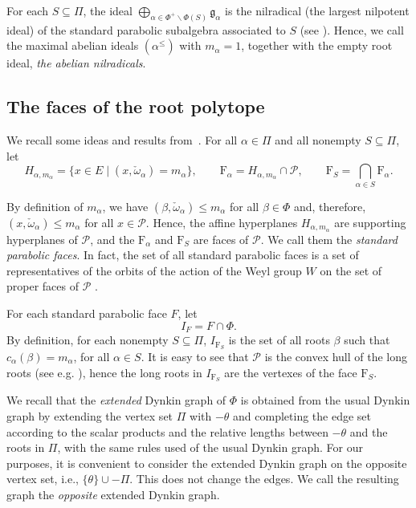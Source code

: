 \documentclass[10pt]{amsart}
\theoremstyle{definition}
\theoremstyle{remark}
\newcommand\mf{\mathfrak}
\newcommand\smeno{\smallsetminus}
\newcommand\pol{\mathcal P}
\newcommand\al{\alpha}
\newcommand\be{\beta}
\renewcommand{\leq}{\leqslant}
\begin{document}
\par
For each $S\subseteq \Pi$, the ideal $\bigoplus\limits_{\al\in \Phi^+\smeno \Phi(S)}\mf g_\al$ is the nilradical (the largest nilpotent ideal) of the standard parabolic subalgebra  associated to $S$ (see \cite[Ch.~VIII, \S~3.4]{Bou2}). 
Hence, we call the maximal abelian ideals $(\al^\leq)$ with $m_\al=1$, together  with the empty root ideal, {\it the abelian nilradicals}. 

\subsection{The faces of the root polytope}\label{ssec:faces}
We recall some ideas and results from~\cite{CM1}. 
For all $\al\in \Pi$ and  all nonempty $S\subseteq \Pi$,  let
$$
H_{\al, m_\al}=\{x\in E\mid(x, \check\omega_\al)=m_\al\}, \qquad 
\mathrm F_\al=H_{\al, m_\al}\cap \pol,
\qquad
\mathrm F_S=\bigcap_{\al\in S} \mathrm F_\al.
$$

By definition of $m_\al$, we have $(\be, \check\omega_\al)\leq m_\al$ for all $\be\in \Phi$ and, therefore, $(x, \check\omega_\al)\leq m_\al$ for all $x\in \pol$. 
Hence, the affine hyperplanes $H_{\al, m_\al}$ are supporting hyperplanes of $\pol$, and the $\mathrm F_\al$ and  $\mathrm F_S$ are faces of $\pol$.  
We call them the {\it standard parabolic faces}. 
In fact, the set of all standard parabolic faces is a set of representatives of the orbits of  the action of the Weyl group $W$  on the set of proper faces of $\pol$ \cite{CM1} . 

\par
For each standard parabolic face $F$, let 
$$
I_F=F \cap \Phi.
$$
By definition,  for each nonempty $S\subseteq \Pi$, $I_{\mathrm F_S}$ is the set of all roots $\be$ such that $c_\al(\be)=m_\al$, for all $\al\in S$. 
It is easy to see that $\pol$ is the convex hull of the long roots (see  e.g. \cite{CM3}), hence the long roots in $I_{\mathrm F_S}$ are the vertexes of the face $\mathrm F_S$. 
\par

We recall that the {\it extended} Dynkin graph of $\Phi$ is obtained from the usual Dynkin graph by extending the vertex set $\Pi$ with $-\theta$ and completing the edge set according to the scalar products and the relative lengths between $-\theta$ and the roots in $\Pi$, with the same rules  used of the usual Dynkin graph.
For our purposes, it is convenient to consider the extended Dynkin graph on the opposite vertex set, i.e., $\{\theta\}\cup -\Pi$. 
This does not change the edges. 
We call the resulting graph the {\it opposite} extended Dynkin graph.
\par
\end{document}

